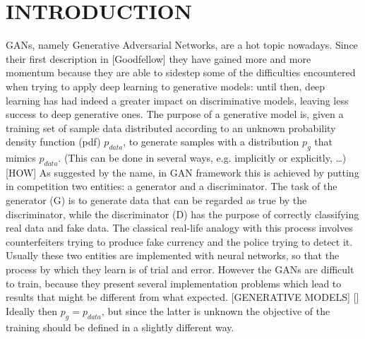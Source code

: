 \section{INTRODUCTION} \label{intro}
GANs, namely Generative Adversarial Networks, are a hot topic nowadays. Since their first description in [Goodfellow] they have gained more and more momentum because they are able to sidestep some of the difficulties encountered when trying to apply deep learning to generative models: until then, deep learning has had indeed a greater impact on discriminative models, leaving less success to deep generative ones. The purpose of a generative model is, given a training set of sample data distributed according to an unknown probability density function (pdf) $p_{data}$, to generate samples with a distribution $p_g$ that mimics $p_{data}$. (This can be done in several ways, e.g. implicitly or explicitly, …)
[HOW] As suggested by the name, in GAN framework this is achieved by putting in competition two entities: a generator and a discriminator. The task of the generator (G) is to generate data that can be regarded as true by the discriminator, while the discriminator (D) has the purpose of correctly classifying real data and fake data. The classical real-life analogy with this process involves counterfeiters trying to produce fake currency and the police trying to detect it. Usually these two entities are implemented with neural networks, so that the process by which they learn is of trial and error. However the GANs are difficult to train, because they present several implementation problems which lead to results that might be different from what expected.
[GENERATIVE MODELS]
[] Ideally then $p_g = p_{data}$, but since the latter is unknown the objective of the training should be defined in a slightly different way. 